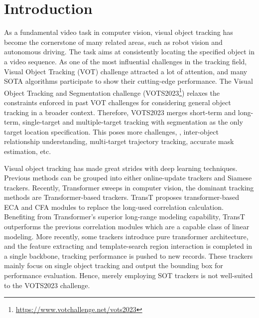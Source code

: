 \documentclass[10pt,twocolumn,letterpaper]{article}
\begin{document}
\section{Introduction}
\label{sec:intro}
As a fundamental video task in computer vision, visual object tracking has become the cornerstone of many related areas, such as robot vision and autonomous driving. The task aims at consistently locating the specified object in a video sequence. As one of the most influential challenges in the tracking field, Visual Object Tracking (VOT) challenge \cite{vot21,vot22} attracted a lot of attention, and many SOTA algorithms participate to show their cutting-edge performance. The Visual Object Tracking and Segmentation challenge (VOTS2023\footnote{\url{https://www.votchallenge.net/vots2023}}) relaxes the constraints enforced in past VOT challenges for considering general object tracking in a broader context. Therefore, VOTS2023 merges short-term and long-term, single-target and multiple-target tracking with segmentation as the only target location specification. This poses more challenges, \eg, inter-object relationship understanding, multi-target trajectory tracking, accurate mask estimation, etc.

Visual object tracking has made great strides with deep learning techniques\cite{alexnet, resnet, vit}. 
Previous methods can be grouped into either online-update trackers\cite{eco, dimp} and Siamese trackers\cite{siamesefc, siamrcnn}. 
Recently, Transformer\cite{attention_is_all} sweeps in computer vision, the dominant tracking methods are Transformer-based trackers\cite{transt,stark,mixformer,ostrack}. TransT\cite{transt} proposes transformer-based ECA and CFA modules to replace the long-used correlation calculation.
Benefiting from Transformer's superior long-range modeling capability, TransT outperforms the previous correlation modules which are a capable class of linear modeling. 
More recently, some trackers\cite{mixformer, ostrack} introduce pure transformer architecture, and the feature extracting and template-search region interaction is completed in a single backbone, tracking performance is pushed to new records.
These trackers mainly focus on single object tracking and output the bounding box for performance evaluation.
Hence, merely employing SOT trackers is not well-suited to the VOTS2023 challenge.
\end{document}
